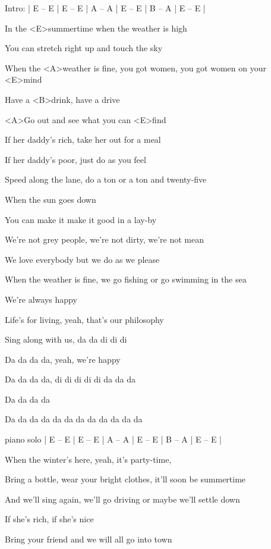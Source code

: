 

\ifdefined\TPBAND

	Intro:
	| E – E | E – E | A – A | E – E | B – A | E – E |
\fi

\zs
In the <E>summertime when the weather is high

You can stretch right up and touch the sky

When the <A>weather is fine, you got women, you got women on your <E>mind

Have a <B>drink, have a drive

<A>Go out and see what you can <E>find
\ks

\zs
If her daddy's rich, take her out for a meal

If her daddy's poor, just do as you feel

Speed along the lane, do a ton or a ton and twenty-five

When the sun goes down

You can make it make it good in a lay-by
\ks

\zs
We're not grey people, we're not dirty, we're not mean

We love everybody but we do as we please

When the weather is fine, we go fishing or go swimming in the sea

We're always happy

Life's for living, yeah, that's our philosophy
\ks

\zs
Sing along with us, da da di di di

Da da da da, yeah, we're happy

Da da da da, di di di di di da da da

Da da da da

Da da da da da da da da da da da da
\ks

\ifdefined\TPBAND
	piano solo
	| E – E | E – E | A – A | E – E | B – A | E – E |
\fi

\zs
When the winter's here, yeah, it's party-time,

Bring a bottle, wear your bright clothes, it'll soon be summertime

And we'll sing again, we'll go driving or maybe we'll settle down

If she's rich, if she's nice

Bring your friend and we will all go into town
\ks

\kp
